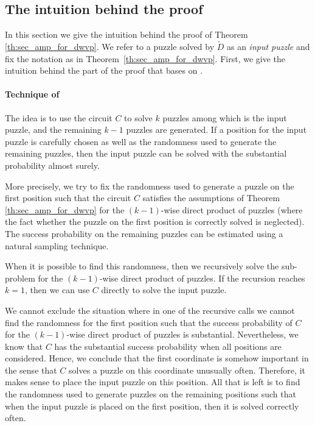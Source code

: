 %
\subsection{The intuition behind the proof}
\label{section:intuition}
In this section we give the intuition behind the proof of Theorem \ref{th:sec_amp_for_dwvp}.
We refer to a puzzle solved by $\widetilde{D}$ as an \textit{input puzzle} and fix the notation as in Theorem~\ref{th:sec_amp_for_dwvp}.
First, we give the intuition behind the part of the proof that bases on \cite{canetti2005hardness, holenstein2011general}.
\paragraph{Technique of \cite{canetti2005hardness, holenstein2011general}}
The idea is to use the circuit $C$ to solve $k$ puzzles among which is the input puzzle, and
the remaining $k\!-\!1$ puzzles are generated.
If a position for the input puzzle is carefully chosen as well as the randomness used to generate the remaining puzzles,
then the input puzzle can be solved with the substantial probability almost surely.

More precisely, we try to fix the randomness used to generate a puzzle on the first position such that
the circuit $C$ satisfies the assumptions of Theorem \ref{th:sec_amp_for_dwvp}
for the $(k\!-\!1)$-wise direct product of puzzles (where the fact whether the puzzle on the first position is correctly solved is neglected).
The success probability on the remaining puzzles can be estimated using a natural sampling technique.

When it is possible to find this randomness, then we recursively solve the sub-problem for the $(k\!-\!1)$-wise direct product of puzzles.
If the recursion reaches $k=1$, then we can use $C$ directly to solve the input puzzle.

We cannot exclude the situation where in one of the recursive calls we cannot
find the randomness for the first position such that the success probability of $C$ for the $(k\!-\!1)$-wise direct product of puzzles is substantial.
Nevertheless, we know that $C$ has the substantial success probability when all positions are considered.
Hence, we conclude that the first coordinate is somehow important in the sense that $C$ solves a puzzle on this coordinate unusually often.
Therefore, it makes sense to place the input puzzle on this position.
All that is left is to find the randomness used to generate puzzles on the remaining positions
such that when the input puzzle is placed on the first position, then it is solved correctly often.

